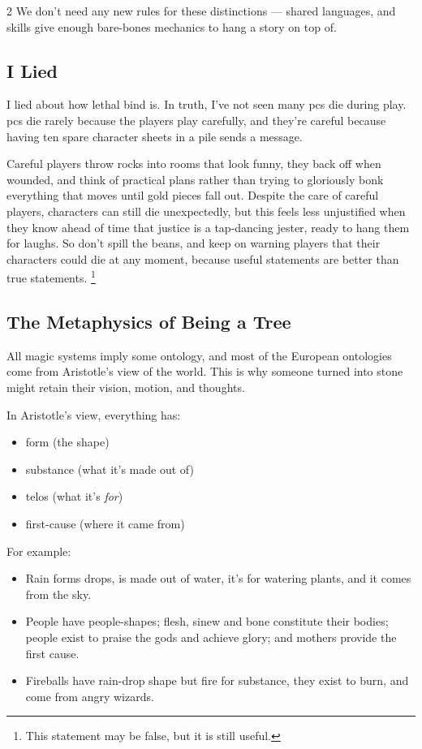 \begin{multicols}{2}
We don't need any new rules for these distinctions --- shared languages, and \glspl{skill} give enough bare-bones mechanics to hang a story on top of.

\subsection{I Lied}
I lied about how lethal \gls{bind} is.
In truth, I've not seen many \glspl{pc} die during play.
\Glspl{pc} die rarely because the players play carefully, and they're careful because having ten spare character sheets in a pile sends a message.

Careful players throw rocks into rooms that look funny, they back off when wounded, and think of practical plans rather than trying to gloriously bonk everything that moves until gold pieces fall out.
Despite the care of careful players, characters can still die unexpectedly, but this feels less unjustified when they know ahead of time that justice is a tap-dancing jester, ready to hang them for laughs.
So don't spill the beans, and keep on warning players that their characters could die at any moment, because useful statements are better than true statements.%
\footnote{This statement may be false, but it is still useful.}

\subsection{The Metaphysics of Being a Tree}

All magic systems imply some ontology, and most of the European ontologies come from Aristotle's view of the world.
This is why someone turned into stone might retain their vision, motion, and thoughts.

In Aristotle's view, everything has:

\begin{itemize}
  \item
  form (the shape)
  \item
  substance (what it's made out of)
  \item
  telos (what it's \emph{for})
  \item
  first-cause (where it came from)
\end{itemize}

For example:

\begin{itemize}
  \item
  Rain forms drops, is made out of water, it's for watering plants, and it comes from the sky.
  \item
  People have people-shapes; flesh, sinew and bone constitute their bodies; people exist to praise the gods and achieve glory; and mothers provide the first cause.
  \item
  Fireballs have rain-drop shape but fire for substance, they exist to burn, and come from angry wizards.
\end{itemize}


\end{multicols}
